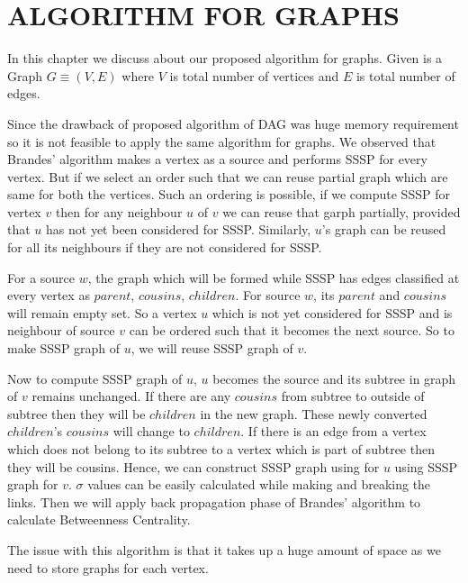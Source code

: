 \chapter{ALGORITHM FOR GRAPHS}
\label{chap:graph}
 
In this chapter we discuss about our proposed algorithm for graphs. 
Given is a Graph $G \equiv (V,E)$ where $V$ is total number of vertices and $E$ is total number of edges.

Since the drawback of proposed algorithm of DAG was huge memory requirement so it is not feasible to apply the same algorithm for graphs. 
We observed that Brandes' algorithm makes a vertex as a source and performs SSSP for every vertex. But if we select an order such that we can reuse partial graph which are same for both the vertices. Such an ordering is possible, if we compute SSSP for vertex $v$ then for any neighbour $u$ of $v$ we can reuse that garph partially, provided that $u$ has not yet been considered for SSSP. Similarly, $u$'s graph can be reused for all its neighbours if they are not considered for SSSP.

For a source $w$, the graph which will be formed while SSSP has edges classified at every vertex as $parent$, $cousins$, $children$.
For source $w$, its $parent$ and $cousins$ will remain empty set.
So a vertex $u$ which is not yet considered for SSSP and is neighbour of source $v$ can be ordered such that it becomes the next source. So to make SSSP graph of $u$, we will reuse SSSP graph of $v$.

Now to compute SSSP graph of $u$, $u$ becomes the source and its subtree in graph of $v$ remains unchanged. If there are any $cousins$ from subtree to outside of subtree then they will be $children$ in the new graph. These newly converted $children$'s $cousins$ will change to $children$.
If there is an edge from a vertex which does not belong to its subtree  to a vertex which is part of subtree then they will be cousins.
Hence, we can construct SSSP graph using for $u$ using SSSP graph for $v$.
$\sigma$ values can be easily calculated while making and breaking the links. Then we will apply back propagation phase of Brandes' algorithm to calculate Betweenness Centrality. 

The issue with this algorithm is that it takes up a huge amount of space as we need to store graphs for each vertex.  





